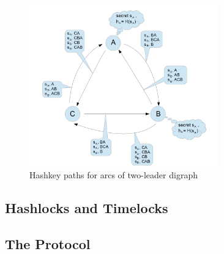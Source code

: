 \begin{figure}[h]
	\includegraphics[height=7cm]{hashkey_paths}	%
	\caption{Hashkey paths for arcs of two-leader digraph}
	\label{fig:hashkey_paths}
\end{figure}

\cite{herlihy2018atomic}

\subsection{Hashlocks and Timelocks}
\label{subsec:background:second_section:hashlock_timelock}

\cite{li2019research}

\subsection{The Protocol}
\label{subsec:background:second_section:protocol}

